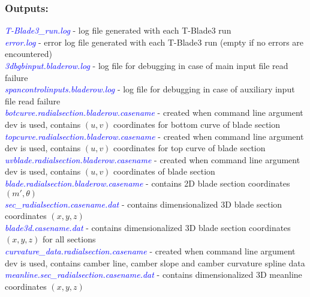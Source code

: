 \documentclass[8pt]{article}
\begin{document}
\subsubsection{Outputs:}\label{outputs}
\noindent
\textit{\textcolor{blue}{T-Blade3\_run.log}} - log file generated with each T-Blade3 run\\
\textit{\textcolor{blue}{error.log}} - error log file generated with each T-Blade3 run (empty if no errors are encountered)\\
\textit{\textcolor{blue}{3dbgbinput.bladerow.log}} - log file for debugging in case of main input file read failure\\
\textit{\textcolor{blue}{spancontrolinputs.bladerow.log}} - log file for debugging in case of auxiliary input file read failure\\
\textit{\textcolor{blue}{botcurve.radialsection.bladerow.casename}} - created when command line argument {\selectfont dev} is used, contains $(u,v)$ coordinates for bottom curve of blade section\\
\textit{\textcolor{blue}{topcurve.radialsection.bladerow.casename}} - created when command line argument {\selectfont dev} is used, contains $(u,v)$ coordinates for top curve of blade section\\
\textit{\textcolor{blue}{uvblade.radialsection.bladerow.casename}} - created when command line argument {\selectfont dev} is used, contains $(u,v)$ coordinates of blade section\\
\textit{\textcolor{blue}{blade.radialsection.bladerow.casename}} - contains 2D blade section coordinates $(m',\theta)$\\
\textit{\textcolor{blue}{sec\_radialsection.casename.dat}} - contains dimensionalized 3D blade section coordinates $(x,y,z)$\\
\textit{\textcolor{blue}{blade3d.casename.dat}} - contains dimensionalized 3D blade section coordinates $(x,y,z)$ for all sections\\
\textit{\textcolor{blue}{curvature\_data.radialsection.casename}} - created when command line argument {\selectfont dev} is used, contains camber line, camber slope and camber curvature spline data\\
\textit{\textcolor{blue}{meanline.sec\_radialsection.casename.dat}} - contains dimensionalized 3D meanline coordinates $(x,y,z)$\\
\end{document}
